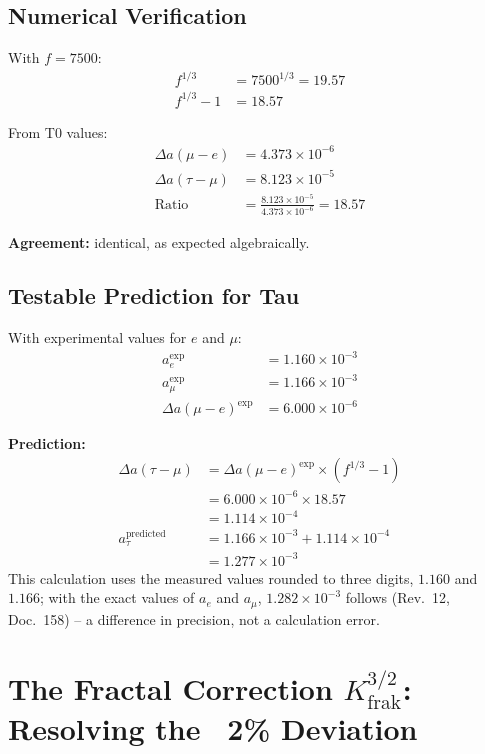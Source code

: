 	\subsection{Numerical Verification}
	
	With $f = 7500$:
	\begin{align}
		f^{1/3} &= 7500^{1/3} = 19.57 \\
		f^{1/3} - 1 &= 18.57
	\end{align}
	
	From T0 values:
	\begin{align}
		\Delta a(\mu - e) &= 4.373 \times 10^{-6} \\
		\Delta a(\tau - \mu) &= 8.123 \times 10^{-5} \\
		\text{Ratio} &= \frac{8.123 \times 10^{-5}}{4.373 \times 10^{-6}} = 18.57
	\end{align}
	
	\textbf{Agreement:} identical, as expected algebraically.
	
	\subsection{Testable Prediction for Tau}
	
	With experimental values for $e$ and $\mu$:
	\begin{align}
		a_e^{\text{exp}} &= 1.160 \times 10^{-3} \\
		a_\mu^{\text{exp}} &= 1.166 \times 10^{-3} \\
		\Delta a(\mu - e)^{\text{exp}} &= 6.000 \times 10^{-6}
	\end{align}
	
	\textbf{Prediction:}
	\begin{align}
		\Delta a(\tau - \mu) &= \Delta a(\mu - e)^{\text{exp}} \times (f^{1/3} - 1) \\
		&= 6.000 \times 10^{-6} \times 18.57 \\
		&= 1.114 \times 10^{-4} \\
		a_\tau^{\text{predicted}} &= 1.166 \times 10^{-3} + 1.114 \times 10^{-4} \\
		&= 1.277 \times 10^{-3}
	\end{align}
	This calculation uses the measured values rounded to three digits, $1.160$ and $1.166$; with the exact values of $a_e$ and $a_\mu$, $1.282 \times 10^{-3}$ follows (Rev.~12, Doc.~158) -- a difference in precision, not a calculation error.
	
	\section{The Fractal Correction $K_\text{frak}^{3/2}$: Resolving the ~2\% Deviation}
	
